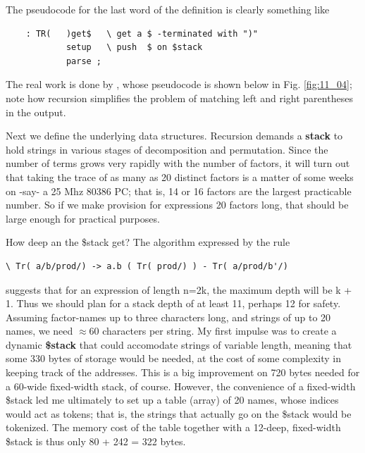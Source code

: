 The pseudocode for the last word of the definition is clearly something like

\begin{lstlisting}
    : TR(   )get$   \ get a $ -terminated with ")"
            setup   \ push  $ on $stack
            parse ;
\end{lstlisting}

The real work is done by , whose pseudocode is shown below in Fig. \ref{fig:11_04}; note how recursion simplifies the problem of matching left and right parentheses in the output.

Next we define the underlying data structures. Recursion demands a \textbf{stack} to hold strings in various stages of decomposition and permutation. Since the number of terms grows very rapidly with the number of factors, it will turn out that taking the trace of as many as 20 distinct factors is a matter of some weeks on -say- a 25 Mhz 80386 PC; that is, 14 or 16 factors are the largest practicable number. So if we make provision for expressions 20 factors long, that should be large enough for practical purposes.



How deep an the \$stack get? The algorithm expressed by the rule

\begin{verbatim}
\ Tr( a/b/prod/) -> a.b ( Tr( prod/) ) - Tr( a/prod/b'/)
\end{verbatim}

suggests that for an expression of length n=2k, the maximum depth will be k + 1. Thus we should plan for a stack depth of at least 11, perhaps 12 for safety. Assuming factor-names up to three characters long, and strings of up to 20 names, we need $\approx$60 characters per string. My first impulse was to create a dynamic \textbf{\$stack} that could accomodate strings of variable length, meaning that some 330 bytes of storage would be needed, at the cost of some complexity in keeping track of the addresses. This is a big improvement on 720 bytes needed for a 60-wide fixed-width stack, of course. However, the convenience of a fixed-width \$stack led me ultimately to set up a table (array) of 20 names, whose indices would act as tokens; that is, the strings that actually go on the \$stack would be tokenized. The memory cost of the table together with a 12-deep, fixed-width \$stack is thus only 80 + 242 = 322 bytes.

